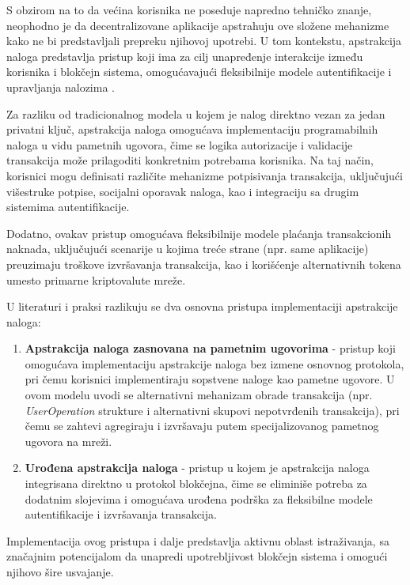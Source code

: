 S obzirom na to da većina korisnika ne poseduje napredno tehničko znanje, neophodno je da decentralizovane aplikacije apstrahuju ove složene mehanizme kako ne bi predstavljali prepreku njihovoj upotrebi. U tom kontekstu, apstrakcija naloga  predstavlja pristup koji ima za cilj unapređenje interakcije između korisnika i blokčejn sistema, omogućavajući fleksibilnije modele autentifikacije i upravljanja nalozima \cite{wang2023account}.

Za razliku od tradicionalnog modela u kojem je nalog direktno vezan za jedan privatni ključ, apstrakcija naloga omogućava implementaciju programabilnih naloga u vidu pametnih ugovora, čime se logika autorizacije i validacije transakcija može prilagoditi konkretnim potrebama korisnika. Na taj način, korisnici mogu definisati različite mehanizme potpisivanja transakcija, uključujući višestruke potpise, socijalni oporavak naloga, kao i integraciju sa drugim sistemima autentifikacije.

Dodatno, ovakav pristup omogućava fleksibilnije modele plaćanja transakcionih naknada, uključujući scenarije u kojima treće strane (npr. same aplikacije) preuzimaju troškove izvršavanja transakcija, kao i korišćenje alternativnih tokena umesto primarne kriptovalute mreže.

U literaturi i praksi razlikuju se dva osnovna pristupa implementaciji apstrakcije naloga:
\begin{enumerate}
\item \textbf{Apstrakcija naloga zasnovana na pametnim ugovorima} \cite{AAeip4337} - pristup koji omogućava implementaciju apstrakcije naloga bez izmene osnovnog protokola, pri čemu korisnici implementiraju sopstvene naloge kao pametne ugovore. U ovom modelu uvodi se alternativni mehanizam obrade transakcija (npr. \textit{UserOperation} strukture i alternativni skupovi nepotvrđenih transakcija), pri čemu se zahtevi agregiraju i izvršavaju putem specijalizovanog pametnog ugovora na mreži.
    
\item \textbf{Urođena apstrakcija naloga} - pristup u kojem je apstrakcija naloga integrisana direktno u protokol blokčejna, čime se eliminiše potreba za dodatnim slojevima i omogućava urođena podrška za fleksibilne modele autentifikacije i izvršavanja transakcija.
\end{enumerate}

Implementacija ovog pristupa i dalje predstavlja aktivnu oblast istraživanja, sa značajnim potencijalom da unapredi upotrebljivost blokčejn sistema i omogući njihovo šire usvajanje.

